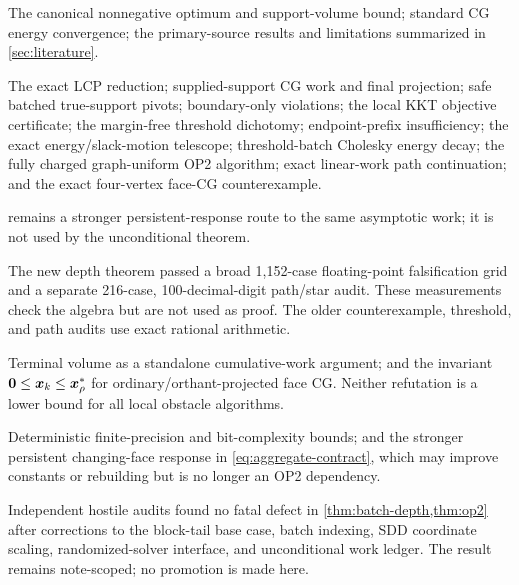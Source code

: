 \begin{description}[style=nextline,leftmargin=2.9cm]
\item[\statussource]
The canonical nonnegative optimum and support-volume bound; standard CG
energy convergence; the primary-source results and limitations summarized in
\cref{sec:literature}.

\item[\statusproved]
The exact LCP reduction; supplied-support CG work and final projection; safe
batched true-support pivots; boundary-only violations; the local KKT
objective certificate; the margin-free threshold dichotomy; endpoint-prefix
insufficiency; the exact energy/slack-motion telescope; threshold-batch
Cholesky energy decay; the fully charged graph-uniform OP2 algorithm; exact
linear-work path continuation; and the exact four-vertex face-CG
counterexample.

\item[\statusconditional]
 remains a stronger persistent-response route to
the same asymptotic work; it is not used by the unconditional theorem.

\item[\statusempirical]
The new depth theorem passed a broad 1,152-case floating-point falsification
grid and a separate 216-case, 100-decimal-digit path/star audit.  These
measurements check the algebra but are not used as proof.  The older
counterexample, threshold, and path audits use exact rational arithmetic.

\item[\statusrefuted]
Terminal volume as a standalone cumulative-work argument; and the invariant
$\bm{0}\leq\bm{x}_k\leq\bm{x}_\rho^*$ for ordinary/orthant-projected face CG.
Neither refutation is a lower bound for all local obstacle algorithms.

\item[\statusopen]
Deterministic finite-precision and bit-complexity bounds; and the stronger
persistent changing-face response in \cref{eq:aggregate-contract}, which may
improve constants or rebuilding but is no longer an OP2 dependency.
\end{description}

Independent hostile audits found no fatal defect in
\cref{thm:batch-depth,thm:op2} after corrections to the block-tail base case,
batch indexing, SDD coordinate scaling, randomized-solver interface, and
unconditional work ledger.  The result remains note-scoped; no promotion is
made here.





